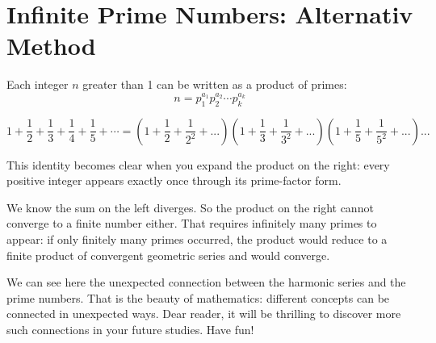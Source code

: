 \section{Infinite Prime Numbers: Alternativ Method}
Each integer \(n\) greater than 1 can be written as a product of primes:
\[
n=p_1^{a_1}p_2^{a_2}\cdots p_k^{a_k}
\]

\[
    1+\frac12+\frac13+\frac14+\frac15+\cdots
    = (1+\frac1{2}+\frac1{2^2}+...)(1+\frac1{3}+\frac1{3^2}+...)(1+\frac1{5}+\frac1{5^2}+...)...
\]

This identity becomes clear when you expand the product on the right: every
positive integer appears exactly once through its prime-factor form.

We know the sum on the left diverges. So the product on the right cannot
converge to a finite number either. That requires infinitely many primes
to appear: if only finitely many primes occurred, the product would reduce
to a finite product of convergent geometric series and would converge.

We can see here the unexpected connection between the harmonic series and the prime numbers.
That is the beauty of mathematics: different concepts can be connected in unexpected ways.
Dear reader, it will be thrilling to discover more such connections in your future studies.
Have fun!
